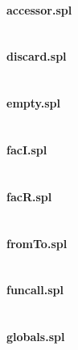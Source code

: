 \documentclass[a4paper]{article}
\begin{document}
\paragraph{accessor.spl}
\begin{verbatim}\end{verbatim}

\paragraph{discard.spl}
\begin{verbatim}\end{verbatim}

\paragraph{empty.spl}
\begin{verbatim}\end{verbatim}

\paragraph{facI.spl}
\begin{verbatim}\end{verbatim}

\paragraph{facR.spl}
\begin{verbatim}\end{verbatim}

\paragraph{fromTo.spl}
\begin{verbatim}\end{verbatim}

\paragraph{funcall.spl}
\begin{verbatim}\end{verbatim}

\paragraph{globals.spl}
\begin{verbatim}\end{verbatim}
\end{document}
